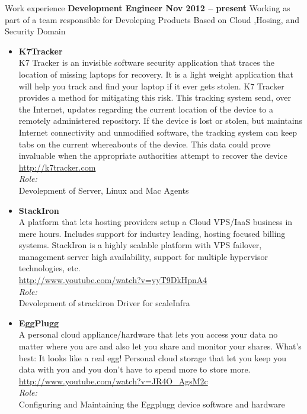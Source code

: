 \documentclass{resume}
\begin{document}
\begin{category}{Work experience}
  \citemnobullet \textbf{{Development Engineer} \hfill Nov 2012 -- present}
  \citemnobullet Working as part of a team responsible for Devoleping Products Based on Cloud ,Hosing, and Security Domain
  \begin{itemize}

  \item {{\bfseries K7Tracker} \\
  K7 Tracker is an invisible software security application that traces the location of missing
  laptops for recovery. It is a light weight application that will help you track and find your
  laptop if it ever gets stolen. K7 Tracker provides a method for mitigating this risk. This
  tracking system send, over the Internet, updates regarding the current location of the device
  to a remotely administered repository. If the device is lost or stolen, but maintains Internet
  connectivity and unmodified software, the tracking system can keep tabs on the current
  whereabouts of the device. This data could prove invaluable when the appropriate authorities attempt to recover the device\\
  \url{http://k7tracker.com}\\
  {\it Role:}\\
  Devolepment of Server, Linux and Mac Agents\\
  }

  \item {{\bfseries StackIron} \\
  A platform that lets hosting providers setup a Cloud VPS/IaaS business in mere hours. 
  Includes support for industry leading, hosting focused billing systems. 
  StackIron is a highly scalable platform with VPS failover, management server high availability,
  support for multiple hypervisor technologies, etc.\\
  \url{http://www.youtube.com/watch?v=yyT9DkHpnA4}\\
  {\it Role:}\\
  Devolepment of strackiron Driver for scaleInfra\\
  } 

  \item{{\bfseries EggPlugg} \\
  A personal cloud appliance/hardware that lets you access your data no matter where you 
  are and also let you share and monitor your shares. What's best: It looks like a real egg! 
  Personal cloud storage that let you keep you data with you and you don't have to spend more to store more. 
  \url{http://www.youtube.com/watch?v=JR4O_AgsM2c}\\
  {\it Role:}\\
  Configuring and Maintaining the Eggplugg device software and hardware\\
  }


\end{itemize}
\end{category}
\end{document}
